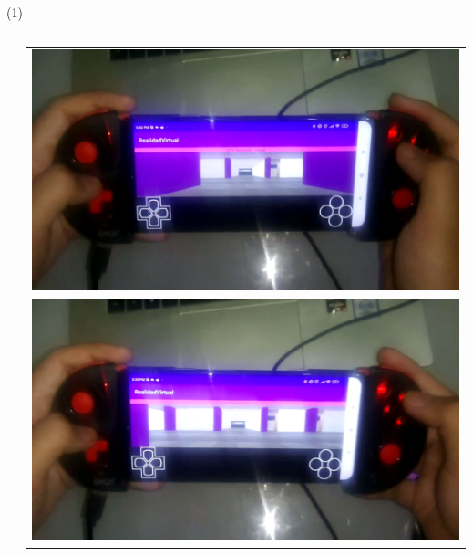\begin{frame}{\citetitle{\EntradaBibtex}  (1)}
\begin{columns}
\begin{column}{0.48\textwidth}
\begin{center}
\begin{tabular}{ccc}
	\end{tabular}
\end{center}
\end{column}
\begin{column}{0.48\textwidth}
\begin{center}
	\begin{tabular}{c}
		    \includegraphics[width=0.45\linewidth]{Figs/UPV_Control03}\\
		    \includegraphics[width=0.45\linewidth]{Figs/UPV_Control05}\\
	\end{tabular}
\end{center}	
\end{column}
\end{columns}
\footnotetext[1]{\fullcite{\EntradaBibtex}}
\end{frame}

